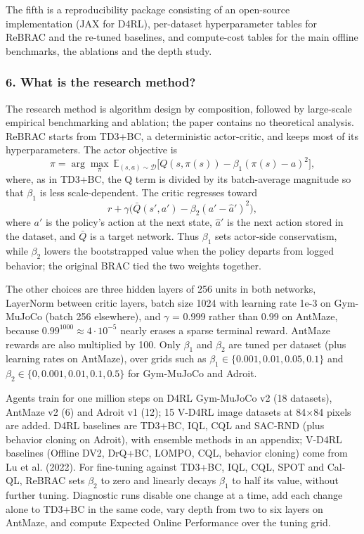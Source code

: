 \documentclass[11pt]{article}
\newcommand{\question}[1]{\subsubsection*{#1}}
\begin{document}
The fifth is a reproducibility package consisting of an open-source implementation (JAX for D4RL), per-dataset hyperparameter tables for ReBRAC and the re-tuned baselines, and compute-cost tables for the main offline benchmarks, the ablations and the depth study.

\question{6. What is the research method?}

The research method is algorithm design by composition, followed by large-scale empirical benchmarking and ablation; the paper contains no theoretical analysis. ReBRAC starts from TD3+BC, a deterministic actor-critic, and keeps most of its hyperparameters. The actor objective is \begin{equation*}\pi=\arg\max_{\pi}\,\mathbb{E}_{(s,a)\sim\mathcal{D}}\big[Q(s,\pi(s))-\beta_1(\pi(s)-a)^{2}\big],\end{equation*} where, as in TD3+BC, the Q term is divided by its batch-average magnitude so that $\beta_{1}$ is less scale-dependent. The critic regresses toward \begin{equation*}r+\gamma\big(\bar{Q}(s',a')-\beta_2(a'-\hat{a}')^{2}\big),\end{equation*} where $a'$ is the policy's action at the next state, $\hat{a}'$ is the next action stored in the dataset, and $\bar{Q}$ is a target network. Thus $\beta_{1}$ sets actor-side conservatism, while $\beta_{2}$ lowers the bootstrapped value when the policy departs from logged behavior; the original BRAC tied the two weights together.

The other choices are three hidden layers of 256 units in both networks, LayerNorm between critic layers, batch size 1024 with learning rate 1e-3 on Gym-MuJoCo (batch 256 elsewhere), and \ensuremath{\gamma} = 0.999 rather than 0.99 on AntMaze, because $0.99^{1000}\approx4\cdot10^{-5}$ nearly erases a sparse terminal reward. AntMaze rewards are also multiplied by 100. Only $\beta_{1}$ and $\beta_{2}$ are tuned per dataset (plus learning rates on AntMaze), over grids such as $\beta_1\in\{0.001,0.01,0.05,0.1\}$ and $\beta_2\in\{0,0.001,0.01,0.1,0.5\}$ for Gym-MuJoCo and Adroit.

Agents train for one million steps on D4RL Gym-MuJoCo v2 (18 datasets), AntMaze v2 (6) and Adroit v1 (12); 15 V-D4RL image datasets at 84\ensuremath{\times}84 pixels are added. D4RL baselines are TD3+BC, IQL, CQL and SAC-RND (plus behavior cloning on Adroit), with ensemble methods in an appendix; V-D4RL baselines (Offline DV2, DrQ+BC, LOMPO, CQL, behavior cloning) come from Lu et al. (2022). For fine-tuning against TD3+BC, IQL, CQL, SPOT and Cal-QL, ReBRAC sets $\beta_{2}$ to zero and linearly decays $\beta_{1}$ to half its value, without further tuning. Diagnostic runs disable one change at a time, add each change alone to TD3+BC in the same code, vary depth from two to six layers on AntMaze, and compute Expected Online Performance over the tuning grid.
\end{document}
